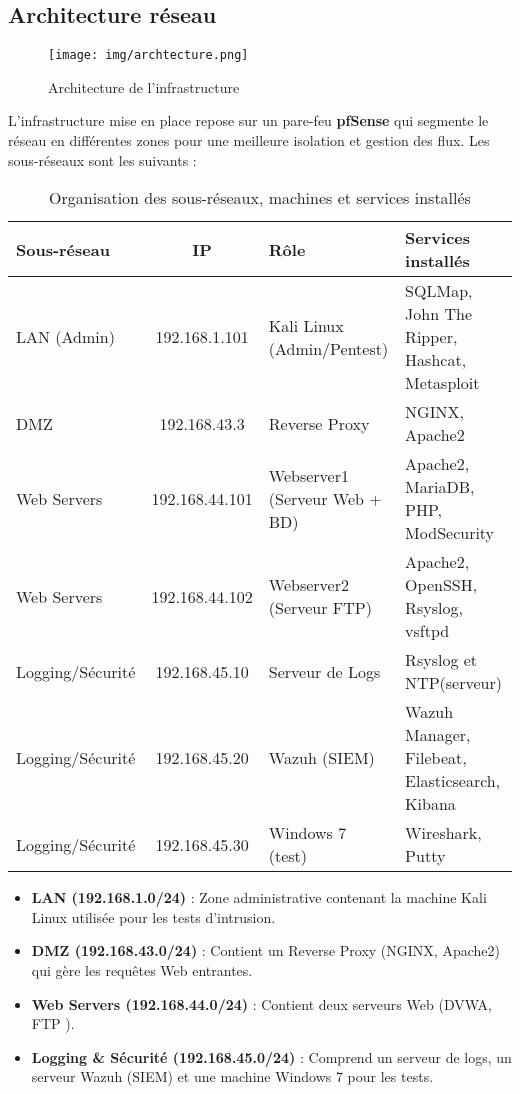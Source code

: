 \documentclass[a4paper,12pt]{report}
\begin{document}
\subsection{Architecture réseau}

\begin{figure}[H] 
\label{archi}
    \centering
    \texttt{[image: img/archtecture.png]} 
    \caption{Architecture de l'infrastructure}
\end{figure}

L'infrastructure mise en place repose sur un pare-feu \textbf{pfSense} qui segmente le réseau en différentes zones pour une meilleure isolation et gestion des flux. Les sous-réseaux sont les suivants :

\begin{table}[H]
    \centering
    \renewcommand{\arraystretch}{1.2} %
    \small %
    \begin{tabularx}{\linewidth}{|l|c|l|X|}
        \hline
        \textbf{Sous-réseau} & \textbf{IP} & \textbf{Rôle} & \textbf{Services installés} \\
        \hline
        LAN (Admin) & 192.168.1.101 & Kali Linux (Admin/Pentest) & SQLMap, John The Ripper, Hashcat, Metasploit \\
        DMZ & 192.168.43.3 & Reverse Proxy & NGINX, Apache2 \\
        Web Servers & 192.168.44.101 & Webserver1 (Serveur Web + BD) & Apache2, MariaDB, PHP, ModSecurity \\
        Web Servers & 192.168.44.102 & Webserver2 (Serveur FTP) & Apache2, OpenSSH, Rsyslog, vsftpd \\
        Logging/Sécurité & 192.168.45.10 & Serveur de Logs & Rsyslog et NTP(serveur) \\
        Logging/Sécurité & 192.168.45.20 & Wazuh (SIEM) & Wazuh Manager, Filebeat, Elasticsearch, Kibana \\
        Logging/Sécurité & 192.168.45.30 & Windows 7 (test) & Wireshark, Putty  \\
        \hline
    \end{tabularx}
    \caption{Organisation des sous-réseaux, machines et services installés}
\end{table}


\begin{itemize}
    \item \textbf{LAN (192.168.1.0/24)} : Zone administrative contenant la machine Kali Linux utilisée pour les tests d'intrusion.
    \item \textbf{DMZ (192.168.43.0/24)} : Contient un Reverse Proxy (NGINX, Apache2) qui gère les requêtes Web entrantes.
    \item \textbf{Web Servers (192.168.44.0/24)} : Contient deux serveurs Web (DVWA, FTP ).
    \item \textbf{Logging \& Sécurité (192.168.45.0/24)} : Comprend un serveur de logs, un serveur Wazuh (SIEM) et une machine Windows 7 pour les tests.
\end{itemize}
\end{document}
